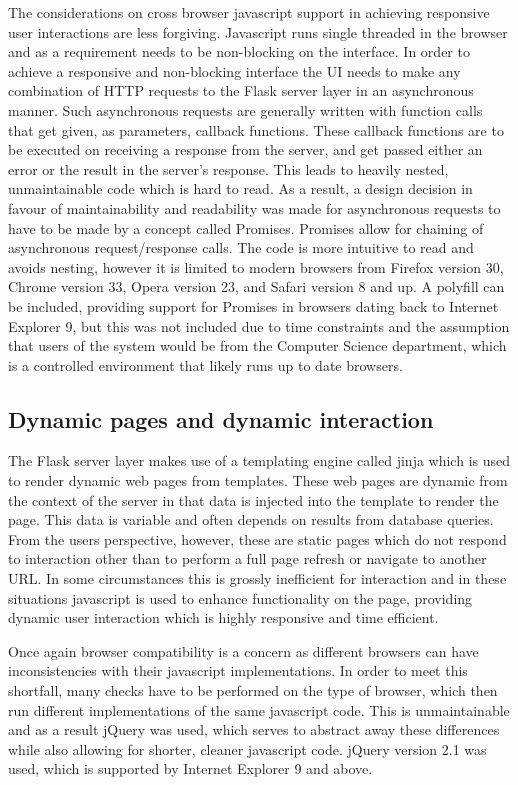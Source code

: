 \documentclass[11pt,a4paper]{article}
\begin{document}
The considerations on cross browser javascript support in achieving responsive
user interactions are less forgiving. Javascript runs single threaded in the
browser and as a requirement needs to be non-blocking on the interface. In order
to achieve a responsive and non-blocking interface the UI needs to make any
combination of HTTP requests to the Flask server layer in an asynchronous
manner. Such asynchronous requests are generally written with function calls
that get given, as parameters, callback functions. These callback functions are
to be executed on receiving a response from the server, and get passed either an
error or the result in the server’s response. This leads to heavily nested, unmaintainable code which is hard to read. As a result, a design decision in favour of maintainability and readability was made for asynchronous requests to have to be made by a concept called Promises. Promises allow for chaining of asynchronous request/response calls. The code is more intuitive to read and avoids nesting, however it is limited to modern browsers from Firefox version 30, Chrome version 33, Opera version 23, and Safari version 8 and up. A polyfill can be included, providing support for Promises in browsers dating back to Internet Explorer 9, but this was not included due to time constraints and the assumption that users of the system would be from the Computer Science department, which is a controlled environment that likely runs up to date browsers.

\subsection{Dynamic pages and dynamic interaction}

The Flask server layer makes use of a templating engine called jinja which is used to render dynamic web pages from templates. These web pages are dynamic from the context of the server in that data is injected into the template to render the page. This data is variable and often depends on results from database queries. From the users perspective, however, these are static pages which do not respond to interaction other than to perform a full page refresh or navigate to another URL. In some circumstances this is grossly inefficient for interaction and in these situations javascript is used to enhance functionality on the page, providing dynamic user interaction which is highly responsive and time efficient.

Once again browser compatibility is a concern as different browsers can have inconsistencies with their javascript implementations. In order to meet this shortfall, many checks have to be performed on the type of browser, which then run different implementations of the same javascript code. This is unmaintainable and as a result jQuery was used, which serves to abstract away these differences while also allowing for shorter, cleaner javascript code. jQuery version 2.1 was used, which is supported by Internet Explorer 9 and above.
\end{document}
